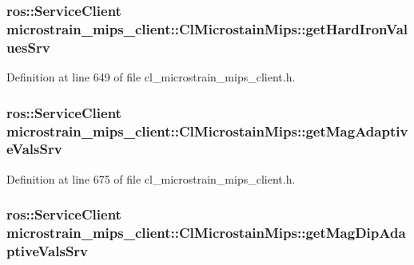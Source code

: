 \subsubsection[{\texorpdfstring{get\+Hard\+Iron\+Values\+Srv}{getHardIronValuesSrv}}]{\setlength{\rightskip}{0pt plus 5cm}ros\+::\+Service\+Client microstrain\+\_\+mips\+\_\+client\+::\+Cl\+Microstain\+Mips\+::get\+Hard\+Iron\+Values\+Srv\hspace{0.3cm}{\ttfamily [protected]}}\hypertarget{classmicrostrain__mips__client_1_1ClMicrostainMips_a712c957de40a04e2b546135b6ce63921}{}\label{classmicrostrain__mips__client_1_1ClMicrostainMips_a712c957de40a04e2b546135b6ce63921}


Definition at line 649 of file cl\+\_\+microstrain\+\_\+mips\+\_\+client.\+h.

\subsubsection[{\texorpdfstring{get\+Mag\+Adaptive\+Vals\+Srv}{getMagAdaptiveValsSrv}}]{\setlength{\rightskip}{0pt plus 5cm}ros\+::\+Service\+Client microstrain\+\_\+mips\+\_\+client\+::\+Cl\+Microstain\+Mips\+::get\+Mag\+Adaptive\+Vals\+Srv\hspace{0.3cm}{\ttfamily [protected]}}\hypertarget{classmicrostrain__mips__client_1_1ClMicrostainMips_a99f756ab750211672215ab77798d2a87}{}\label{classmicrostrain__mips__client_1_1ClMicrostainMips_a99f756ab750211672215ab77798d2a87}


Definition at line 675 of file cl\+\_\+microstrain\+\_\+mips\+\_\+client.\+h.

\subsubsection[{\texorpdfstring{get\+Mag\+Dip\+Adaptive\+Vals\+Srv}{getMagDipAdaptiveValsSrv}}]{\setlength{\rightskip}{0pt plus 5cm}ros\+::\+Service\+Client microstrain\+\_\+mips\+\_\+client\+::\+Cl\+Microstain\+Mips\+::get\+Mag\+Dip\+Adaptive\+Vals\+Srv\hspace{0.3cm}{\ttfamily [protected]}}\hypertarget{classmicrostrain__mips__client_1_1ClMicrostainMips_a748591fd9e95377d11790521ba8cc853}{}\label{classmicrostrain__mips__client_1_1ClMicrostainMips_a748591fd9e95377d11790521ba8cc853}


